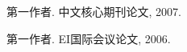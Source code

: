 \begin{publications}{99}
    \item\textsc{第一作者}. {中文核心期刊论文}, 2007.
    \item\textsc{第一作者}. {EI国际会议论文}, 2006.
\end{publications}
